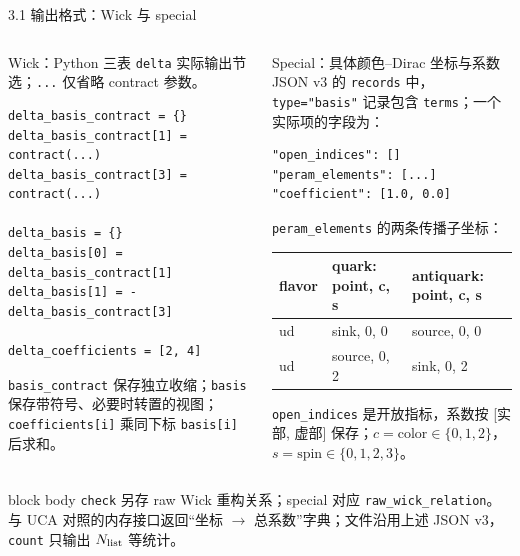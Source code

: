 \documentclass[aspectratio=169,UTF8,fontset=fandol]{ctexbeamer}
\begin{document}
\begin{frame}[fragile]{3.1 输出格式：Wick 与 special}
\scriptsize
\begin{columns}[T,onlytextwidth]
\begin{block}{Wick：Python 三表}
\fontsize{7.2}{8.7}\selectfont
\texttt{delta} 实际输出节选；\texttt{...} 仅省略 contract 参数。
\begin{verbatim}
delta_basis_contract = {}
delta_basis_contract[1] = contract(...)
delta_basis_contract[3] = contract(...)

delta_basis = {}
delta_basis[0] = delta_basis_contract[1]
delta_basis[1] = -delta_basis_contract[3]

delta_coefficients = [2, 4]
\end{verbatim}
\texttt{basis\_contract} 保存独立收缩；\texttt{basis} 保存带符号、必要时转置的视图；\texttt{coefficients[i]} 乘同下标 \texttt{basis[i]} 后求和。
\end{block}
\begin{block}{Special：具体颜色--Dirac 坐标与系数}
\fontsize{7.2}{8.7}\selectfont
JSON v3 的 \texttt{records} 中，\texttt{type="basis"} 记录包含 \texttt{terms}；一个实际项的字段为：
\begin{verbatim}
"open_indices": []
"peram_elements": [...]
"coefficient": [1.0, 0.0]
\end{verbatim}
\texttt{peram\_elements} 的两条传播子坐标：\par
\vspace{0.4em}
\setlength{\tabcolsep}{3pt}
\begin{tabular}{lll}
\toprule
flavor & quark: point, c, s & antiquark: point, c, s\\
\midrule
ud & sink, 0, 0 & source, 0, 0\\
ud & source, 0, 2 & sink, 0, 2\\
\bottomrule
\end{tabular}
\par\vspace{0.4em}
\texttt{open\_indices} 是开放指标，系数按 [实部, 虚部] 保存；\(c=\text{color}\in\{0,1,2\}\)，\(s=\text{spin}\in\{0,1,2,3\}\)。
\end{block}
\end{columns}
\vspace{0.2em}
\begin{beamercolorbox}[sep=0.4em,wd=\linewidth]{block body}
\scriptsize
\texttt{check} 另存 raw Wick 重构关系；special 对应 \texttt{raw\_wick\_relation}。与 UCA 对照的内存接口返回“坐标 \(\to\) 总系数”字典；文件沿用上述 JSON v3，\texttt{count} 只输出 \(N_{\rm list}\) 等统计。
\end{beamercolorbox}
\end{frame}
\end{document}
